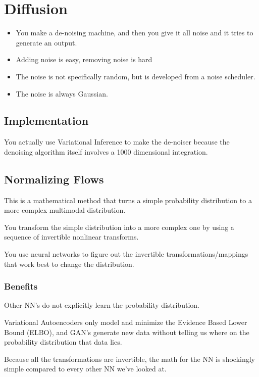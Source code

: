 \documentclass[fleqn]{report}
\begin{document}
\chapter{Diffusion}

\begin{itemize}
    \item
    You make a de-noising machine, and then you give it all noise and it 
    tries to generate an output. 
    \item
    Adding noise is easy, removing noise is hard 
    \item
    The noise is not specifically random, but is developed from a noise scheduler. 
    \item 
    The noise is always Gaussian. 
\end{itemize}

\section{Implementation}
You actually use Variational Inference to make the de-noiser because the 
denoising algorithm itself involves a 1000 dimensional integration. 

\section{Normalizing Flows}
This is a mathematical method that turns a simple probability distribution 
to a more complex multimodal distribution. 

You transform the simple distribution into a more complex one 
by using a sequence of invertible nonlinear transforms. 

You use neural networks to figure out the invertible transformations/mappings 
that work best to change the distribution. 

\subsection{Benefits}
Other NN's do not explicitly learn the probability distribution.

Variational Autoencoders only model and minimize the Evidence Based Lower Bound 
(ELBO), and GAN's generate new data without telling us where on the probability 
distribution that data lies. 

Because all the transformations are invertible, the math for the NN 
is shockingly simple compared to every other NN we've looked at. 
\end{document}
